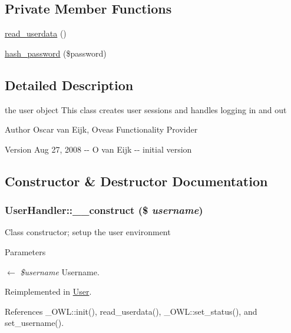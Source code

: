 \subsection*{Private Member Functions}
\begin{DoxyCompactItemize}
\item 
\hyperlink{classUserHandler_a4e9fb2f7763124ea84ebaf3b744d2d88}{read\_\-userdata} ()
\item 
\hyperlink{classUserHandler_a6b2bbbdb4f1a08578c219a933880a1de}{hash\_\-password} (\$password)
\end{DoxyCompactItemize}


\subsection{Detailed Description}
the user object This class creates user sessions and handles logging in and out \begin{DoxyAuthor}{Author}
Oscar van Eijk, Oveas Functionality Provider 
\end{DoxyAuthor}
\begin{DoxyVersion}{Version}
Aug 27, 2008 -\/-\/ O van Eijk -\/-\/ initial version 
\end{DoxyVersion}


\subsection{Constructor \& Destructor Documentation}
\subsubsection[{\_\-\_\-construct}]{\setlength{\rightskip}{0pt plus 5cm}UserHandler::\_\-\_\-construct (\$ {\em username})}\label{classUserHandler_a624054e9693139a3fe5af0ef3b757f04}
Class constructor; setup the user environment


\begin{DoxyParams}{Parameters}
\item[\mbox{$\leftarrow$} {\em \$username}]Username. \end{DoxyParams}


Reimplemented in \hyperlink{classUser_ab8a717f17626301cc8b7815a43ea5b5b}{User}.



References \_\-OWL::init(), read\_\-userdata(), \_\-OWL::set\_\-status(), and set\_\-username().

